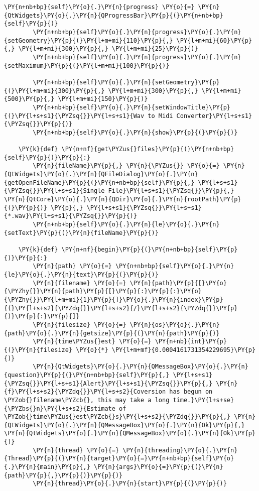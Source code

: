 \begin{Verbatim}[commandchars=\\\{\}]
        \PY{n+nb+bp}{self}\PY{o}{.}\PY{n}{progress} \PY{o}{=} \PY{n}{QtWidgets}\PY{o}{.}\PY{n}{QProgressBar}\PY{p}{(}\PY{n+nb+bp}{self}\PY{p}{)}
        \PY{n+nb+bp}{self}\PY{o}{.}\PY{n}{progress}\PY{o}{.}\PY{n}{setGeometry}\PY{p}{(}\PY{l+m+mi}{110}\PY{p}{,} \PY{l+m+mi}{60}\PY{p}{,} \PY{l+m+mi}{300}\PY{p}{,} \PY{l+m+mi}{25}\PY{p}{)}
        \PY{n+nb+bp}{self}\PY{o}{.}\PY{n}{progress}\PY{o}{.}\PY{n}{setMaximum}\PY{p}{(}\PY{l+m+mi}{100}\PY{p}{)}

        \PY{n+nb+bp}{self}\PY{o}{.}\PY{n}{setGeometry}\PY{p}{(}\PY{l+m+mi}{300}\PY{p}{,} \PY{l+m+mi}{300}\PY{p}{,} \PY{l+m+mi}{500}\PY{p}{,} \PY{l+m+mi}{150}\PY{p}{)}
        \PY{n+nb+bp}{self}\PY{o}{.}\PY{n}{setWindowTitle}\PY{p}{(}\PY{l+s+s1}{\PYZsq{}}\PY{l+s+s1}{Wav to Midi Converter}\PY{l+s+s1}{\PYZsq{}}\PY{p}{)}
        \PY{n+nb+bp}{self}\PY{o}{.}\PY{n}{show}\PY{p}{(}\PY{p}{)}

    \PY{k}{def} \PY{n+nf}{get\PYZus{}files}\PY{p}{(}\PY{n+nb+bp}{self}\PY{p}{)}\PY{p}{:}
        \PY{n}{fileName}\PY{p}{,} \PY{n}{\PYZus{}} \PY{o}{=} \PY{n}{QtWidgets}\PY{o}{.}\PY{n}{QFileDialog}\PY{o}{.}\PY{n}{getOpenFileName}\PY{p}{(}\PY{n+nb+bp}{self}\PY{p}{,} \PY{l+s+s1}{\PYZsq{}}\PY{l+s+s1}{Single File}\PY{l+s+s1}{\PYZsq{}}\PY{p}{,} \PY{n}{QtCore}\PY{o}{.}\PY{n}{QDir}\PY{o}{.}\PY{n}{rootPath}\PY{p}{(}\PY{p}{)} \PY{p}{,} \PY{l+s+s1}{\PYZsq{}}\PY{l+s+s1}{*.wav}\PY{l+s+s1}{\PYZsq{}}\PY{p}{)}
        \PY{n+nb+bp}{self}\PY{o}{.}\PY{n}{le}\PY{o}{.}\PY{n}{setText}\PY{p}{(}\PY{n}{fileName}\PY{p}{)}
        
    \PY{k}{def} \PY{n+nf}{begin}\PY{p}{(}\PY{n+nb+bp}{self}\PY{p}{)}\PY{p}{:}
        \PY{n}{path} \PY{o}{=} \PY{n+nb+bp}{self}\PY{o}{.}\PY{n}{le}\PY{o}{.}\PY{n}{text}\PY{p}{(}\PY{p}{)}
        \PY{n}{filename} \PY{o}{=} \PY{n}{path}\PY{p}{[}\PY{o}{\PYZhy{}}\PY{n}{path}\PY{p}{[}\PY{p}{:}\PY{p}{:}\PY{o}{\PYZhy{}}\PY{l+m+mi}{1}\PY{p}{]}\PY{o}{.}\PY{n}{index}\PY{p}{(}\PY{l+s+s2}{\PYZdq{}}\PY{l+s+s2}{/}\PY{l+s+s2}{\PYZdq{}}\PY{p}{)}\PY{p}{:}\PY{p}{]}
        \PY{n}{filesize} \PY{o}{=} \PY{n}{os}\PY{o}{.}\PY{n}{path}\PY{o}{.}\PY{n}{getsize}\PY{p}{(}\PY{n}{path}\PY{p}{)}
        \PY{n}{time\PYZus{}est} \PY{o}{=} \PY{n+nb}{int}\PY{p}{(}\PY{n}{filesize} \PY{o}{*} \PY{l+m+mf}{0.0004161731354229695}\PY{p}{)}
        \PY{n}{QtWidgets}\PY{o}{.}\PY{n}{QMessageBox}\PY{o}{.}\PY{n}{question}\PY{p}{(}\PY{n+nb+bp}{self}\PY{p}{,} \PY{l+s+s1}{\PYZsq{}}\PY{l+s+s1}{Alert}\PY{l+s+s1}{\PYZsq{}}\PY{p}{,} \PY{n}{f}\PY{l+s+s2}{\PYZdq{}}\PY{l+s+s2}{Coversion has begun on \PYZob{}filename\PYZcb{}, this may take a long time.}\PY{l+s+se}{\PYZbs{}n}\PY{l+s+s2}{Estimate of \PYZob{}time\PYZus{}est\PYZcb{}s}\PY{l+s+s2}{\PYZdq{}}\PY{p}{,} \PY{n}{QtWidgets}\PY{o}{.}\PY{n}{QMessageBox}\PY{o}{.}\PY{n}{Ok}\PY{p}{,} \PY{n}{QtWidgets}\PY{o}{.}\PY{n}{QMessageBox}\PY{o}{.}\PY{n}{Ok}\PY{p}{)}
        \PY{n}{thread} \PY{o}{=} \PY{n}{threading}\PY{o}{.}\PY{n}{Thread}\PY{p}{(}\PY{n}{target}\PY{o}{=}\PY{n+nb+bp}{self}\PY{o}{.}\PY{n}{main}\PY{p}{,} \PY{n}{args}\PY{o}{=}\PY{p}{(}\PY{n}{path}\PY{p}{,}\PY{p}{)}\PY{p}{)}
        \PY{n}{thread}\PY{o}{.}\PY{n}{start}\PY{p}{(}\PY{p}{)}



\end{Verbatim}
